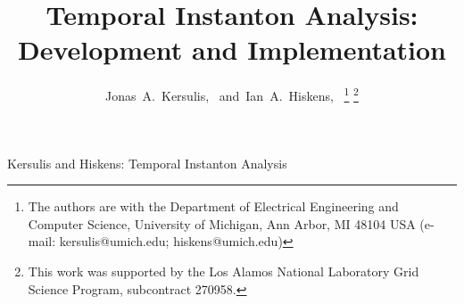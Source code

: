 \documentclass[journal,twoside]{IEEEtran}
\begin{document}
%
\title{Temporal Instanton Analysis:\\
Development and Implementation}
%
%
%

\author{Jonas~A.~Kersulis,~
        and~Ian~A.~Hiskens,~%
\thanks{The authors are with the Department of Electrical Engineering and Computer Science, University of Michigan, Ann Arbor, MI 48104 USA (e-mail: 
kersulis@umich.edu; hiskens@umich.edu)}%
\thanks{This work was supported by the Los Alamos National Laboratory Grid Science Program, subcontract 270958.}}

% 
%

%
{Kersulis and Hiskens: Temporal Instanton Analysis}
% 
\end{document}
